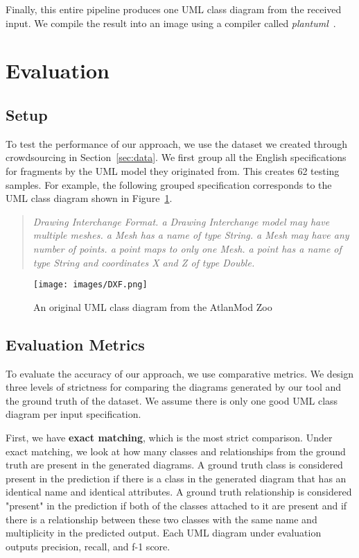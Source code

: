 \documentclass[sigconf]{acmart}
\begin{document}
Finally, this entire pipeline produces one UML class diagram from the received input. We compile the result into an image using a compiler called \textit{plantuml}~\cite{plantuml}.

\section{Evaluation}
\subsection{Setup}
\label{sec:evaluation}
To test the performance of our approach, we use the dataset we created through crowdsourcing in Section~\ref{sec:data}. We first group all the English specifications for fragments by the UML model they originated from. This creates 62 testing samples. For example, the following grouped specification corresponds to the UML class diagram shown in Figure~\ref{fig:original-dxf}.

\begin{quote}
    \textit{Drawing Interchange Format. a Drawing Interchange model may have multiple meshes. a Mesh has a name of type String. a Mesh may have any number of points. a point maps to only one Mesh. a point has a name of type String and coordinates X and Z of type Double.}
\end{quote}

\begin{figure}[h]
    \centering
    \texttt{[image: images/DXF.png]}
    \caption{An original UML class diagram from the AtlanMod Zoo}
    \label{fig:original-dxf}
\end{figure}

\subsection{Evaluation Metrics} \label{sec:metrics}
To evaluate the accuracy of our approach, we use comparative metrics. We design three levels of strictness for comparing the diagrams generated by our tool and the ground truth of the dataset. We assume there is only one good UML class diagram per input specification.

First, we have \textbf{exact matching}, which is the most strict comparison. Under exact matching, we look at how many classes and relationships from the ground truth are present in the generated diagrams. A ground truth class is considered present in the prediction if there is a class in the generated diagram that has an identical name and identical attributes. A ground truth relationship is considered "present" in the prediction if both of the classes attached to it are present and if there is a relationship between these two classes with the same name and multiplicity in the predicted output. Each UML diagram under evaluation outputs precision, recall, and f-1 score.
\end{document}
